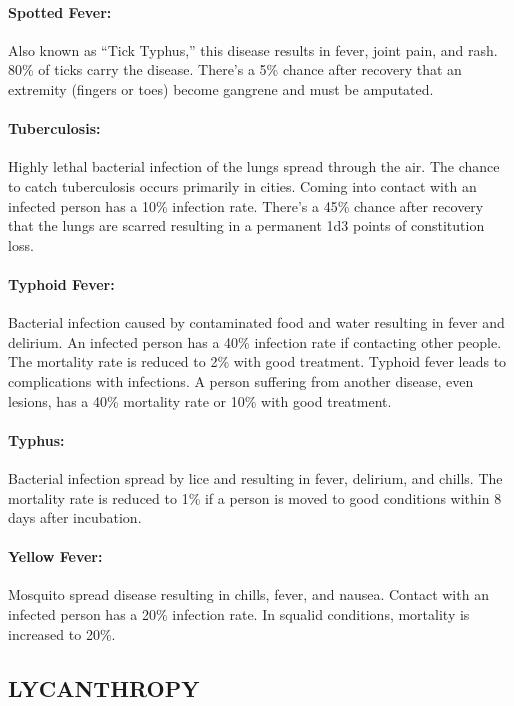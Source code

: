 \begin{multicols}{2}
\paragraph{Spotted Fever:} Also known as “Tick Typhus,” this disease results in fever, joint pain, and rash.  80\% of ticks carry the disease.  There's a 5\% chance after recovery that an extremity (fingers or toes) become gangrene and must be amputated.  

\paragraph{Tuberculosis:} Highly lethal bacterial infection of the lungs spread through the air.  The chance to catch tuberculosis occurs primarily in cities.  Coming into contact with an infected person has a 10\% infection rate.  There's a 45\% chance after recovery that the lungs are scarred resulting in a permanent 1d3 points of constitution loss.

\paragraph{Typhoid Fever:} Bacterial infection caused by contaminated food and water resulting in fever and delirium.  An infected person has a 40\% infection rate if contacting other people.  The mortality rate is reduced to 2\% with good treatment.  Typhoid fever leads to complications with infections.  A person suffering from another disease, even lesions, has a 40\% mortality rate or 10\% with good treatment.

\paragraph{Typhus:} Bacterial infection spread by lice and resulting in fever, delirium, and chills.  The mortality rate is reduced to 1\% if a person is moved to good conditions within 8 days after incubation.

\paragraph{Yellow Fever:}  Mosquito spread disease resulting in chills, fever, and nausea.  Contact with an infected person has a 20\% infection rate.  In squalid conditions, mortality is increased to 20\%.

\subsection{LYCANTHROPY}


\end{multicols}
